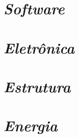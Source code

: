 \section{\textit{Software}}

\section{\textit{Eletrônica}}

\section{\textit{Estrutura}}

\section{\textit{Energia}}
